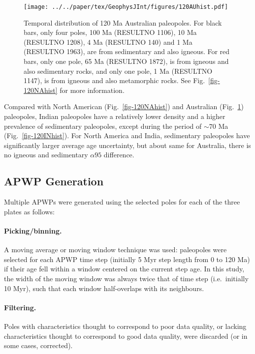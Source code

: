 \begin{figure}
  \centering
  \texttt{[image: ../../paper/tex/GeophysJInt/figures/120AUhist.pdf]}
  \caption[Distribution of 120 Ma Australian paleopoles]{Temporal
    distribution of 120 Ma Australian paleopoles. For black bars,
    only four poles, 100 Ma (RESULTNO 1106), 10 Ma
    (RESULTNO 1208), 4 Ma (RESULTNO 140) and 1 Ma
    (RESULTNO 1963), are from sedimentary and also igneous. For red bars, only
    one pole, 65 Ma (RESULTNO 1872), is from igneous and also
    sedimentary rocks, and only one pole, 1 Ma (RESULTNO 1147), is
    from igneous and also metamorphic rocks. See Fig.~\ref{fig-120NAhist} for
    more information.}\label{fig-120AUhist}
\end{figure}

\bigskip
Compared with North American (Fig.~\ref{fig-120NAhist}) and Australian
(Fig.~\ref{fig-120AUhist}) paleopoles, Indian paleopoles have a relatively lower
density and a higher prevalence of sedimentary paleopoles, except during the
period of ${\sim}70$ Ma (Fig.~\ref{fig-120INhist}). For North
America and India, sedimentary paleopoles have significantly larger average age
uncertainty, but about same for Australia, there is no igneous and sedimentary
${\alpha}95$ difference.

\subsection{APWP Generation}\label{sec:apwpg}

Multiple APWPs were generated using the selected poles for each of the three
plates as follows:

\paragraph{Picking/binning.} A moving average or moving window technique was
used: paleopoles were selected for each APWP time step (initially 5 Myr step
length from 0 to 120 Ma) if their age fell within a window centered on the
current step age. In this study, the width of the moving window was always twice
that of time step (i.e.\ initially 10 Myr), such that each window half-overlaps
with its neighbours.

\paragraph{Filtering.} Poles with characteristics thought to correspond to
poor data quality, or lacking characteristics thought to correspond to good
data quality, were discarded (or in some cases, corrected).

